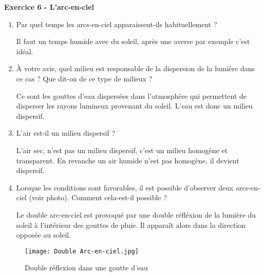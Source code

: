 \documentclass[french, a4paper, 12pt]{article}
\newcommand{\exo}[3]{
	\begin{mdframed}[style=exo, leftmargin=0pt, rightmargin=0pt, innertopmargin=8pt, innerbottommargin=8pt, innerrightmargin=10pt, innerleftmargin=10pt]

		\noindent \textbf{Exercice #1 - #2}\medskip

		#3
	\end{mdframed}
}
\begin{document}
\exo{6}{L'arc-en-ciel}{
	\begin{enumerate}
		\item Par quel temps les arcs-en-ciel apparaissent-ils habituellement ?\bigskip
		
		Il faut un temps humide avec du soleil, après une averse par exemple c'est idéal.

		\item À votre avis, quel milieu est responsable de la dispersion de la lumière dans ce cas ? Que dit-on de ce type de milieux ? 
		
		Ce sont les gouttes d'eau dispersées dans l'atmosphère qui permettent de disperser les rayons lumineux provenant du soleil. L'eau est donc un milieu dispersif.

		\item L'air est-il un milieu dispersif ?
		
		L'air sec, n'est pas un milieu dispersif, c'est un milieu homogène et transparent. En revanche un air humide n'est pas homogène, il devient dispersif.

		\item Lorsque les conditions sont favorables, il est possible d'observer deux arcs-en-ciel (voir photo). Comment cela-est-il possible ?
		
		Le double arc-en-ciel est provoqué par une double réfléxion de la lumière du soleil à l'intérieur des gouttes de pluie. Il apparaît alors dans la direction opposée au soleil.
	\end{enumerate}
}

\begin{figure}[ht]
	\centering
	\texttt{[image: Double Arc-en-ciel.jpg]}
	\caption{Double réflexion dans une goutte d'eau}
\end{figure}
\end{document}
